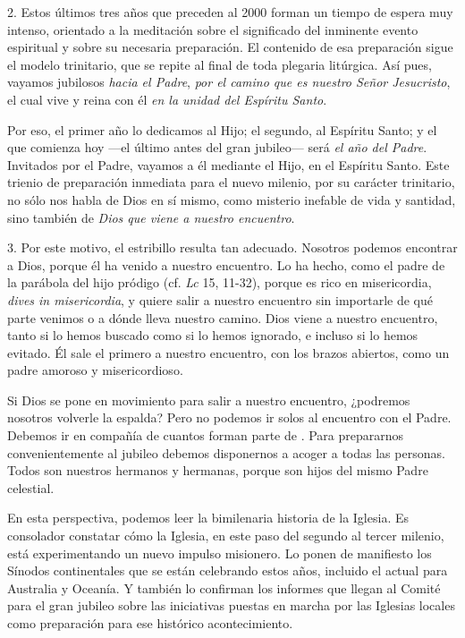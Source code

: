 \begin{body}
				2. Estos últimos tres años que preceden al 2000 forman un tiempo de espera muy intenso, orientado a la meditación sobre el significado del inminente evento espiritual y sobre su necesaria preparación. El contenido de esa preparación sigue el modelo trinitario, que se repite al final de toda plegaria litúrgica. Así pues, vayamos jubilosos \emph{hacia el Padre}, \emph{por el camino que es nuestro Señor Jesucristo}, el cual vive y reina con él \emph{en la unidad del Espíritu Santo}. 
				
				Por eso, el primer año lo dedicamos al Hijo; el segundo, al Espíritu Santo; y el que comienza hoy ---el último antes del gran jubileo--- será \emph{el año del Padre}. Invitados por el Padre, vayamos a él mediante el Hijo, en el Espíritu Santo. Este trienio de preparación inmediata para el nuevo milenio, por su carácter trinitario, no sólo nos habla de Dios en sí mismo, como misterio inefable de vida y santidad, sino también de \emph{Dios que viene a nuestro encuentro}. 
				
				3. Por este motivo, el estribillo  resulta tan adecuado. Nosotros podemos encontrar a Dios, porque él ha venido a nuestro encuentro. Lo ha hecho, como el padre de la parábola del hijo pródigo (cf. \emph{Lc} 15, 11-32), porque es rico en misericordia, \emph{dives in misericordia}, y quiere salir a nuestro encuentro sin importarle de qué parte venimos o a dónde lleva nuestro camino. Dios viene a nuestro encuentro, tanto si lo hemos buscado como si lo hemos ignorado, e incluso si lo hemos evitado. Él sale el primero a nuestro encuentro, con los brazos abiertos, como un padre amoroso y misericordioso. 
				
				Si Dios se pone en movimiento para salir a nuestro encuentro, ¿podremos nosotros volverle la espalda? Pero no podemos ir solos al encuentro con el Padre. Debemos ir en compañía de cuantos forman parte de . Para prepararnos convenientemente al jubileo debemos disponernos a acoger a todas las personas. Todos son nuestros hermanos y hermanas, porque son hijos del mismo Padre celestial. 
				
				En esta perspectiva, podemos leer la bimilenaria historia de la Iglesia. Es consolador constatar cómo la Iglesia, en este paso del segundo al tercer milenio, está experimentando un nuevo impulso misionero. Lo ponen de manifiesto los Sínodos continentales que se están celebrando estos años, incluido el actual para Australia y Oceanía. Y también lo confirman los informes que llegan al Comité para el gran jubileo sobre las iniciativas puestas en marcha por las Iglesias locales como preparación para ese histórico acontecimiento. 
				

\end{body}
